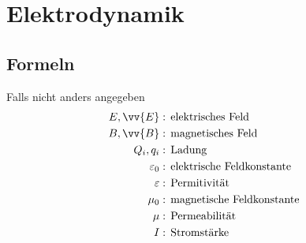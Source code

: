 \documentclass[a4paper,12pt]{article}
\numberwithin{equation}{section}
\begin{document}


\newpage


\section{Elektrodynamik}


\subsection{Formeln}
Falls nicht anders angegeben
\begin{align} 
        E,\vv{E}&:\,\text{elektrisches Feld}\,\nonumber \\
        B,\vv{B}&:\,\text{magnetisches Feld}\,\nonumber \\
        Q_i,q_i&:\,\text{Ladung}\,\nonumber \\
        \varepsilon _0&:\,\text{elektrische Feldkonstante}\,\nonumber \\
        \varepsilon &:\,\text{Permitivität}\,\nonumber \\
        \mu _0&:\,\text{magnetische Feldkonstante}\,\nonumber \\
        \mu &:\,\text{Permeabilität}\,\nonumber \\
        I&:\,\text{Stromstärke}\,\nonumber 
\end{align} 
\end{document}
